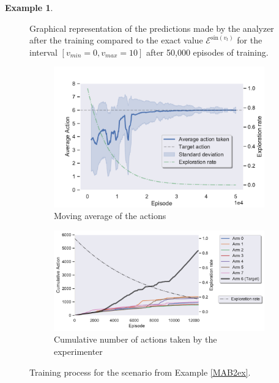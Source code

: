 \documentclass[11pt,a4paper,twoside]{report}
\newcommand{\+}{\textnormal{+} }
\theoremstyle{definition}
\newtheorem{myex}[mythm]{Example}
\numberwithin{equation}{chapter}
\begin{document}
\begin{myex}
\begin{figure}
      \caption{Graphical representation of the predictions made by the analyzer
      after the training compared to the exact value $\mathscr{E}^{\text{sin}(v_t)}$ for 
      the interval $[v_{min}=0,v_{max}=10]$ after 50,000 episodes of training.}
      \label{performanceMBA2}
    \end{figure}


    \begin{figure}[]
      \centering
      \begin{subfigure}{.5\textwidth}
        \centering
        \includegraphics[width=1\linewidth]{figures/Actions-MAB2.pdf}
        \caption{Moving average of the actions}
        \label{fig:ActionAverageMAB2}
      \end{subfigure}%
      \begin{subfigure}{.5\textwidth}
        \centering
        \includegraphics[width=1\linewidth]{figures/Cum-action-MAB2.pdf}
        \caption{Cumulative number of actions taken by the experimenter}
        \label{fig:actionsMAB2}
      \end{subfigure}
      \caption{Training process for the scenario from Example \ref{MAB2ex}.
}
\end{figure}
\end{myex}
\end{document}
